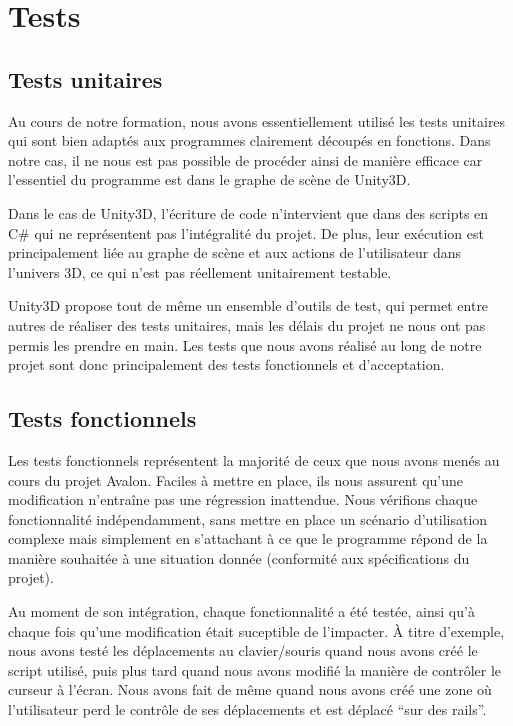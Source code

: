 \section{Tests}

\subsection{Tests unitaires}
Au cours de notre formation, nous avons essentiellement utilisé les tests unitaires qui sont bien adaptés aux programmes clairement découpés en fonctions.
Dans notre cas, il ne nous est pas possible de procéder ainsi de manière efficace car l'essentiel du programme est dans le graphe de scène de Unity3D. \newline

Dans le cas de Unity3D, l'écriture de code n'intervient que dans des scripts en C\# qui ne représentent pas l'intégralité du projet. De plus, leur exécution est principalement liée au graphe de scène et aux actions de l'utilisateur dans l'univers 3D, ce qui n'est pas réellement unitairement testable.\newline

Unity3D propose tout de même un ensemble d'outils de test, qui permet entre autres de réaliser des tests unitaires, mais les délais du projet ne nous ont pas permis les prendre en main. Les tests que nous avons réalisé au long de notre projet sont donc principalement des tests fonctionnels et d'acceptation. 

\subsection{Tests fonctionnels}
Les tests fonctionnels représentent la majorité de ceux que nous avons menés au cours du projet Avalon. Faciles à mettre en place, ils nous assurent qu'une modification n'entraîne pas une régression inattendue. Nous vérifions chaque fonctionnalité indépendamment, sans mettre en place un scénario d'utilisation complexe mais simplement en s'attachant à ce que le programme répond de la manière souhaitée à une situation donnée (conformité aux spécifications du projet).\newline

Au moment de son intégration, chaque fonctionnalité a été testée, ainsi qu'à chaque fois qu'une modification était suceptible de l'impacter. À titre d'exemple, nous avons testé les déplacements au clavier/souris quand nous avons créé le script utilisé, puis plus tard quand nous avons modifié la manière de contrôler le curseur à l'écran. Nous avons fait de même quand nous avons créé une zone où l'utilisateur perd le contrôle de ses déplacements et est déplacé \enquote{sur des rails}.\newline

